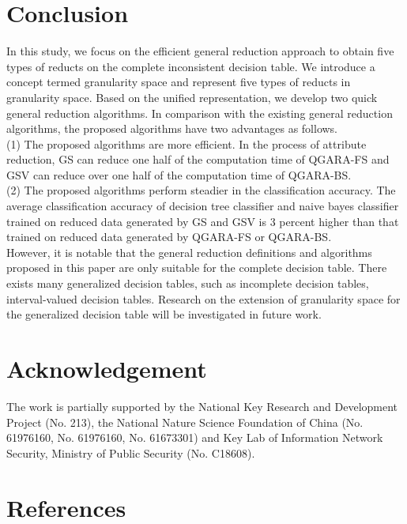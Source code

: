 \documentclass[review]{elsarticle}
\begin{document}
\section{Conclusion}
	\par In this study, we focus on the efficient general reduction approach to obtain five types of reducts on the complete inconsistent decision table. We introduce a concept termed granularity space and represent five types of reducts in granularity space. Based on the unified representation, we develop two quick general reduction algorithms. In comparison with the existing general reduction algorithms, the proposed algorithms have two advantages as follows.
	\\\indent(1) The proposed algorithms are more efficient. In the process of attribute reduction, GS can reduce one half of the computation time of QGARA-FS and GSV can reduce over one half of the computation time of QGARA-BS.
	\\\indent(2) The proposed algorithms perform steadier in the classification accuracy. The average classification accuracy of decision tree classifier and naive bayes classifier trained on reduced data generated by GS and GSV is 3 percent higher than that trained on reduced data generated by QGARA-FS or QGARA-BS.
	\\\indent However, it is notable that the general reduction definitions and algorithms proposed in this paper are only suitable for the complete decision table. There exists many generalized decision tables, such as incomplete decision tables, interval-valued decision tables. Research on the extension of granularity space for the generalized decision table will be investigated in future work.  
\section*{Acknowledgement}
	The work is partially supported by the National Key Research and Development Project (No. 213), the National Nature Science Foundation of China (No.  61976160, No. 61976160, No. 61673301) and Key Lab of Information Network Security, Ministry of Public Security (No. C18608).
\section*{References}



\end{document}
